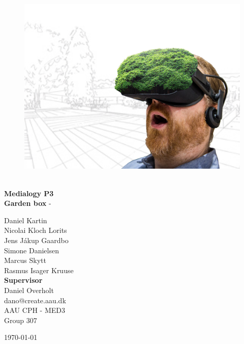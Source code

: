 \begin{titlepage}
			
\addtolength{\voffset}{2cm}

\begin{figure}[H]
\centering
\vspace{2cm}	%
\includegraphics[width=0.99\linewidth]{figure/Frontpage/gardenposterCropped.png}
\end{figure}

\mbox{}
\vfill
\renewcommand{\familydefault}{\sfdefault} \normalfont %
\HRule\\[0.1cm]
\textbf{{\small Medialogy P3\\ {\Huge Garden box}}} \hspace{0.15cm} {\Huge -} \\
\HRule\smallskip{}
\begin{multicols}{2}
{\Large Daniel Kartin\vspace{0.3mm}\\Nicolai Kloch Lorits\\Jens Jákup Gaardbo\\Simone Danielsen\\Marcus Skytt\\Rasmus Isager Kruuse\columnbreak}\\
\setlength{\parskip}{2.4cm}
\Large{\textbf{Supervisor}\\Daniel Overholt\\dano@create.aau.dk}
\\\small AAU CPH - 
MED3 \\
Group 307\\
\end{multicols}
\today
\renewcommand{\familydefault}{\rmdefault} \normalfont %
\end{titlepage}


